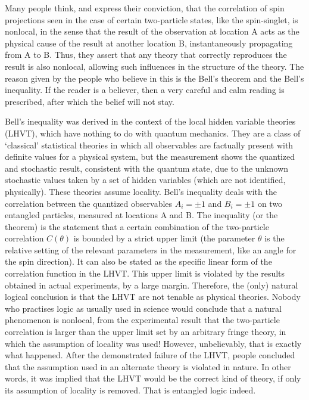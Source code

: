 Many people think, and express their conviction, that the correlation of spin projections
seen in the case of certain two-particle states, like the spin-singlet, is nonlocal, in the sense
that the result of the observation at location A acts as the physical cause of the result at
another location B, instantaneously propagating from A to B. Thus, they assert that any
theory that correctly reproduces the result is also nonlocal, allowing such influences in the
structure of the theory. The reason given by the people who believe in this is the Bell's
theorem and the Bell's inequality. If the reader is a believer, then a very careful and calm
reading is prescribed, after which the belief will not stay.

Bell's inequality \cite{chap14-key12} was derived in the context of the local hidden variable theories
(LHVT), which have nothing to do with quantum mechanics. They are a class of `classical'
statistical theories in which all observables are factually present with definite values for a
physical system, but the measurement shows the quantized and stochastic result, consistent
with the quantum state, due to the unknown stochastic values taken by a set of hidden variables (which are not identified, physically). These theories assume locality. Bell's inequality deals with the correlation between the quantized observables $A_i = \pm 1$ and $B_i = \pm 1$ on two
entangled particles, measured at locations A and B. The inequality (or the theorem) is the
statement that a certain combination of the two-particle correlation $C (\theta)$ is bounded by a
strict upper limit (the parameter $\theta$ is the relative setting of the relevant parameters in the
measurement, like an angle for the spin direction). It can also be stated as the specific linear
form of the correlation function in the LHVT. This upper limit is violated by the results
obtained in actual experiments, by a large margin. Therefore, the (only) natural logical
conclusion is that the LHVT are not tenable as physical theories. Nobody who practises
logic as usually used in science would conclude that a natural phenomenon is nonlocal, from
the experimental result that the two-particle correlation is larger than the upper limit set
by an arbitrary fringe theory, in which the assumption of locality was used! However, unbelievably, that is exactly what happened. After the demonstrated failure of the LHVT,
people concluded that the assumption used in an alternate theory is violated in nature. In
other words, it was implied that the LHVT would be the correct kind of theory, if only its
assumption of locality is removed. That is entangled logic indeed.

